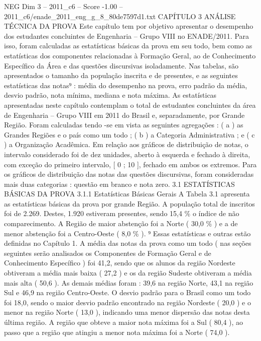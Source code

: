 \begin{textsample}{NEG Dim 3 – 2011\_c6 – Score -1.00 – 2011\_c6/enade\_2011\_eng\_g\_8\_80de7597d1.txt}  \label{ex:f3_neg_076}
CAPÍTULO 3 ANÁLISE TÉCNICA DA PROVA Este capítulo tem por objetivo apresentar o desempenho dos estudantes concluintes de Engenharia – Grupo VIII no ENADE/2011.
Para isso, foram calculadas as estatísticas básicas da prova em seu todo, bem como as estatísticas dos componentes relacionadas à Formação Geral, ao de Conhecimento Específico da Área e das questões discursivas isoladamente.
Nas tabelas, são apresentados o tamanho da população inscrita e de presentes, e as seguintes estatísticas das notas⁹ : média do desempenho na prova, erro padrão da média, desvio padrão, nota mínima, mediana e nota máxima.
As estatísticas apresentadas neste capítulo contemplam o total de estudantes concluintes da área de Engenharia – Grupo VIII em 2011 do Brasil e, separadamente, por Grande Região.
Foram calculadas tendo -se em vista as seguintes agregações : ( a ) as Grandes Regiões e o país como um todo ; ( b ) a Categoria Administrativa ; e ( c ) a Organização Acadêmica.
Em relação aos gráficos de distribuição de notas, o intervalo considerado foi de dez unidades, aberto à esquerda e fechado à direita, com exceção do primeiro intervalo, [ 0 ; 10 ], fechado em ambos os extremos.
Para os gráficos de distribuição das notas das questões discursivas, foram consideradas mais duas categorias : questão em branco e nota zero. 3.1 ESTATÍSTICAS BÁSICAS DA PROVA 3.1.1 Estatísticas Básicas Gerais A Tabela 3.1 apresenta as estatísticas básicas da prova por grande Região.
A população total de inscritos foi de 2.269.
Destes, 1.920 estiveram presentes, sendo 15,4 \% o índice de não comparecimento.
A Região de maior abstenção foi a Norte ( 30,0 \% ) e a de menor abstenção foi a Centro-Oeste ( 8,0 \% ). ⁹ Essas estatísticas e outras estão definidas no Capítulo 1.
A média das notas da prova como um todo ( nas seções seguintes serão analisados os Componentes de Formação Geral e de Conhecimento Específico ) foi 41,2, sendo que os alunos da região Nordeste obtiveram a média mais baixa ( 27,2 ) e os da região Sudeste obtiveram a média mais alta ( 50,6 ).
As demais médias foram : 39,6 na região Norte, 43,1 na região Sul e 46,9 na região Centro-Oeste.
O desvio padrão para o Brasil como um todo foi 18,0, sendo o maior desvio padrão encontrado na região Nordeste ( 20,0 ) e o menor na região Norte ( 13,0 ), indicando uma menor dispersão das notas desta última região.
A região que obteve a maior nota máxima foi a Sul ( 80,4 ), ao passo que a região que atingiu a menor nota máxima foi a Norte ( 74,0 ).

\end{textsample}
